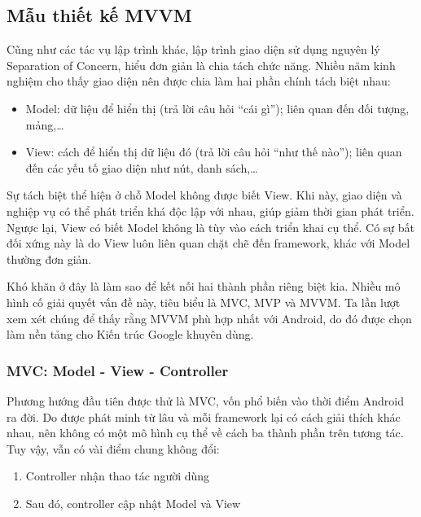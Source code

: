 \documentclass[../../thesis]{subfiles}
\begin{document}
\subsection{Mẫu thiết kế MVVM}\label{sec:mvvm}

Cũng như các tác vụ lập trình khác, lập trình giao diện sử dụng nguyên lý
Separation of Concern, hiểu đơn giản là chia tách chức năng. Nhiều năm kinh
nghiệm cho thấy giao diện nên được chia làm hai phần chính tách biệt nhau:

\begin{itemize}
    \item
        Model: dữ liệu để hiển thị (trả lời câu hỏi ``cái gì''); liên quan đến
        đối tượng, mảng,\ldots
    \item
        View: cách để hiển thị dữ liệu đó (trả lời câu hỏi ``như thế nào'');
        liên quan đến các yếu tố giao diện như nút, danh sách,\ldots
\end{itemize}

Sự tách biệt thể hiện ở chỗ Model không được biết View. Khi này, giao diện và
nghiệp vụ có thể phát triển khá độc lập với nhau, giúp giảm thời gian phát
triển. Ngược lại, View có biết Model không là tùy vào cách triển khai cụ thể. Có
sự bất đối xứng này là do View luôn liên quan chặt chẽ đến framework, khác với
Model thường đơn giản.

Khó khăn ở đây là làm sao để kết nối hai thành phần riêng biệt kia. Nhiều mô
hình cố giải quyết vấn đề này, tiêu biểu là MVC, MVP và MVVM. Ta lần lượt xem
xét chúng để thấy rằng MVVM phù hợp nhất với Android, do đó được chọn làm nền
tảng cho Kiến trúc Google khuyên dùng.

\subsubsection{MVC: Model - View - Controller}

Phương hướng đầu tiên được thử là MVC, vốn phổ biến vào thời điểm Android ra
đời. Do được phát minh từ lâu và mỗi framework lại có cách giải thích khác nhau,
nên không có một mô hình cụ thể về cách ba thành phần trên tương tác. Tuy vậy,
vẫn có vài điểm chung không đổi:

\begin{enumerate}
    \item
        Controller nhận thao tác người dùng
    \item
        Sau đó, controller cập nhật Model và View
\end{enumerate}
\end{document}
